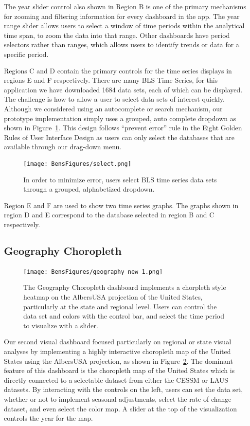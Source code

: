 \documentclass[journal]{IEEEtran}
\begin{document}
{The year slider control also shown in Region B is one of the primary mechanisms for zooming and filtering information for every dashboard in the app. The year range slider allows users to select a window of time periods within the analytical time span, to zoom the data into that range. Other dashboards have period selectors rather than ranges, which allows users to identify trends or data for a specific period.

Regions C and D contain the primary controls for the time series displays in regions E and F respectively. There are many BLS Time Series, for this application we have downloaded 1684 data sets, each of which can be displayed. The challenge is how to allow a user to select data sets of interest quickly. Although we considered using an autocomplete or search mechanism, our prototype implementation simply uses a grouped, auto complete dropdown as shown in Figure~\ref{fig:select}. This design follows ``prevent error'' rule in the Eight Golden Rules of User Interface Design \cite{shneiderman_eight_????} as users can only select the databases that are available through our drag-down menu.

\begin{figure}[h]
    \centering
    \texttt{[image: BensFigures/select.png]}
    \caption{In order to minimize error, users select BLS time series data sets through a grouped, alphabetized dropdown.}
    \label{fig:select}
\end{figure}

Region E and F are used to show two time series graphs. The graphs shown in region D and E correspond to the  database selected in region B and C respectively.

\subsection{Geography Choropleth}

\begin{figure}[!ht]
    \centering
    \texttt{[image: BensFigures/geography\_new\_1.png]}
    \caption{The Geography Choropleth dashboard implements a chorpleth style heatmap on the AlbersUSA projection of the United States, particularly at the state and regional level. Users can control the data set and colors with the control bar, and select the time period to visualize with a slider.}
    \label{fig:Geography}
\end{figure}

Our second visual dashboard focused particularly on regional or state visual analyses by implementing a highly interactive choropleth map of the United States using the AlbersUSA projection, as shown in Figure~\ref{fig:Geography}. The dominant feature of this dashboard is the choropleth map of the United States which is directly connected to a selectable dataset from either the CESSM or LAUS datasets. By interacting with the controls on the left, users can set the data set, whether or not to implement seasonal adjustments, select the rate of change dataset, and even select the color map. A slider at the top of the visualization controls the year for the map.

}
\end{document}
